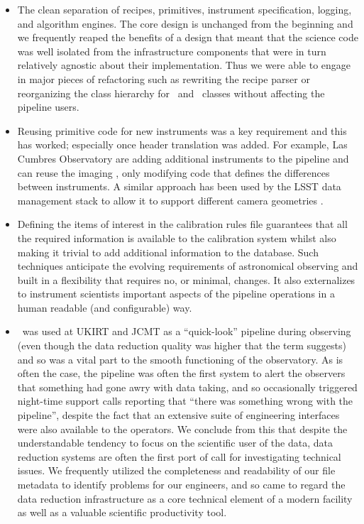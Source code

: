\documentclass[final,authoryear,5p,times,twocolumn]{elsarticle}
\begin{document}
\begin{itemize}

\item The clean separation of recipes, primitives, instrument
  specification, logging, and algorithm engines. The core design is
  unchanged from the beginning and we frequently reaped the benefits
  of a design that meant that the science code was well isolated from
  the infrastructure components that were in turn relatively agnostic
  about their implementation. Thus we were able to engage in major
  pieces of refactoring such as rewriting the recipe parser or
  reorganizing the class hierarchy for \Frame\ and \Group\ classes
  without affecting the pipeline users.

\item Reusing primitive code for new instruments was a key requirement
  and this has worked; especially once header translation was
  added. For example, Las Cumbres Observatory are adding additional
  instruments to the pipeline and can reuse the imaging \primitives,
  only modifying code that defines the differences between
  instruments. A similar approach has been used by the LSST data
  management stack to allow it to support different camera geometries
  \citep{2010SPIE.7740E..15A}.

\item Defining the items of interest in the calibration rules file
  guarantees that all the required information is available to the
  calibration system whilst also making it trivial to add additional
  information to the database. Such techniques anticipate the evolving
  requirements of astronomical observing and built in a flexibility
  that requires no, or minimal, changes. It also externalizes to
  instrument scientists important aspects of the pipeline operations
  in a human readable (and configurable) way.

\item \oracdr\ was used at UKIRT and JCMT as a ``quick-look'' pipeline
  during observing (even though the data reduction quality was higher
  that the term suggests) and so was a vital part to the smooth
  functioning of the observatory. As is often the case, the pipeline
  was often the first system to alert the observers that something had
  gone awry with data taking, and so occasionally triggered night-time
  support calls reporting that ``there was something wrong with the
  pipeline'', despite the fact that an extensive suite of engineering
  interfaces were also available to the operators. We conclude from
  this that despite the understandable tendency to focus on the
  scientific user of the data, data reduction systems are often the
  first port of call for investigating technical issues. We frequently
  utilized the completeness and readability of our file metadata to
  identify problems for our engineers, and so came to regard the data
  reduction infrastructure as a core technical element of a modern
  facility as well as a valuable scientific productivity tool.

\end{itemize}
\end{document}
